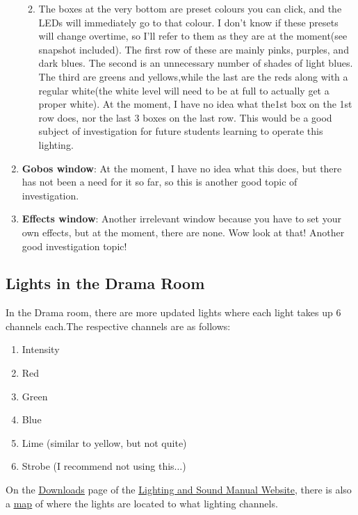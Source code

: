 \documentclass{article}
\begin{document}
\begin{enumerate}
\begin{enumerate}
\begin{enumerate}
        \end{enumerate}
        \item \label{itm:colour_presets} The boxes at the very bottom are preset colours you can click, and the LEDs will immediately go to that colour. I don’t know if these presets will change overtime, so I’ll refer to them as they are at the moment(see snapshot included). The first row of these are mainly pinks, purples, and dark blues. The second is an unnecessary number of shades of light blues. The third are greens and yellows,while the last are the reds along with a regular white(the white level will need to be at full to actually get a proper white). At the moment, I have no idea what the1st box on the 1st row does, nor the last 3 boxes on the last row. This would be a good subject of investigation for future students learning to operate this lighting.
    \end{enumerate}
    \item \textbf{Gobos window}: At the moment, I have no idea what this does, but there has not been a need for it so far, so this is another good topic of investigation.
    \item \textbf{Effects window}: Another irrelevant window because you have to set your own effects, but at the moment, there are none. Wow look at that! Another good investigation topic!
\end{enumerate}

\subsection{Lights in the Drama Room}
In the Drama room, there are more updated lights where each light takes up 6 channels each.The respective channels are as follows:
\begin{enumerate}
    \item Intensity
    \item Red
    \item Green
    \item Blue
    \item Lime (similar to yellow, but not quite)
    \item Strobe (I recommend not using this$\ldots$)
\end{enumerate}
On the \href{https://hussein-esmail7.github.io/site/lighting/downloads.html}{\underline{Downloads}} page of the \href{https://hussein-esmail7.github.io/site/lighting/index.html}{\underline{Lighting and Sound Manual Website}}, there is also a \href{https://hussein-esmail7.github.io/site/lighting/documents/Stage_lights_map.pdf}{\underline{map}} of where the lights are located to what lighting channels.
\end{document}
